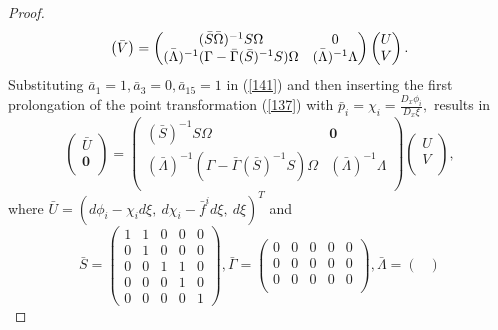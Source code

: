 \documentclass[10pt,a4paper]{amsart}
\begin{document}
\begin{proof}
\begin{equation}
\begin{pmatrix}
\bar{V}\\
\end{pmatrix}=
\begin{pmatrix}
(\bar{S}\bar{\Omega})^{-1}S\Omega&\textbf{0}\\
(\bar{\Lambda})^{-1}(\Gamma-\bar{\Gamma}(\bar{S})^{-1}S)\Omega&(\bar{\Lambda})^{-1}\Lambda\\
\end{pmatrix}\begin{pmatrix}
U\\
V\\
\end{pmatrix}.\\
\end{equation}
Substituting $\bar{a}_1=1, \bar{a}_3=0,\bar{a}_{15}=1$ in (\ref{141}) and then inserting the first prolongation of the point transformation (\ref{137}) with $\bar{p}_i=\chi_i=\frac{D_x\phi_i}{D_x\xi},$ results in
\begin{equation}\label{s3-11}
\begin{pmatrix}
\bar{U}\\
\textbf{0}\\
\end{pmatrix}=
\begin{pmatrix}
(\bar{S})^{-1}S\Omega&\textbf{0}\\
(\bar{\Lambda})^{-1}(\Gamma-\bar{\Gamma}(\bar{S})^{-1}S)\Omega&(\bar{\Lambda})^{-1}\Lambda\\
\end{pmatrix}\begin{pmatrix}
U\\
V\\
\end{pmatrix},
\end{equation}
where $\bar{U}=(d\phi_i-\chi_id\xi,~d\chi_i-\bar{f}^id\xi, ~d\xi)^{T}$ and
\begin{equation}
\bar{S}=\begin{pmatrix}
1&1&0&0&0\\
0&1&0&0&0\\
0&0&1&1&0\\
0&0&0&1&0\\
0&0&0&0&1
\end{pmatrix}, \bar{\Gamma}=\begin{pmatrix}
0&0&0&0&0\\
0&0&0&0&0\\
0&0&0&0&0\\
\end{pmatrix}, \bar{\Lambda}=\begin{pmatrix}

\end{pmatrix}
\end{equation}
\end{proof}
\end{document}
